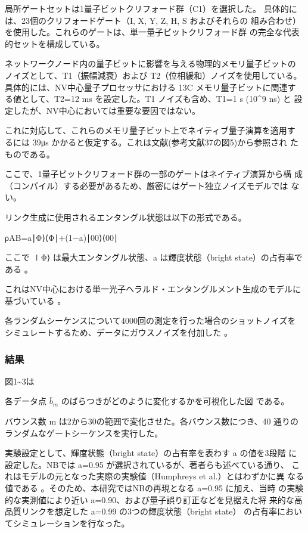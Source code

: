 \documentclass[conference]{IEEEtran}
\begin{document}
局所ゲートセットは1量子ビットクリフォード群（C1​）を選択した。
具体的には、23個のクリフォードゲート（I, X, Y, Z, H, S およびそれらの
組み合わせ）を使用した。これらのゲートは、単一量子ビットクリフォード群
の完全な代表的セットを構成している。


ネットワークノード内の量子ビットに影響を与える物理的メモリ量子ビットの
ノイズとして、T1​（振幅減衰）および T2​（位相緩和）ノイズを使用している。
具体的には、NV中心量子プロセッサにおける 13C メモリ量子ビットに関連す
る値として、T2​=12 ms を設定した。T1​ ノイズも含め、T1​=1 s (10\^{}9 ns) と
設定したが、NV中心においては重要な要因ではない。

これに対応して、これらのメモリ量子ビット上でネイティブ量子演算を適用す
るには 39μs かかると仮定する。これは文献(参考文献37の図5)から参照され
たものである。

ここで、1量子ビットクリフォード群の一部のゲートはネイティブ演算から構
成（コンパイル）する必要があるため、厳密にはゲート独立ノイズモデルでは
ない。

リンク生成に使用されるエンタングル状態は以下の形式である。

ρAB​=a∣Φ⟩⟨Φ∣+(1−a)∣00⟩⟨00∣

ここで ∣Φ⟩ は最大エンタングル状態、a は輝度状態（bright state）の占有率である 。

これはNV中心における単一光子ヘラルド・エンタングルメント生成のモデルに
基づいている 。

各ランダムシーケンスについて4000回の測定を行った場合のショットノイズを
シミュレートするため、データにガウスノイズを付加した 。




\subsubsection*{結果}
\label{sec:orgb15528b}
図1\textasciitilde{}3は

各データ点 \(\bar{b}_m\) のばらつきがどのように変化するかを可視化した図
である。

バウンス数 m は2から30の範囲で変化させた。各バウンス数につき、40
通りのランダムなゲートシーケンスを実行した。


実験設定として、輝度状態（bright state）の占有率を表わす a の値を3段階
に設定した。NBでは a=0.95 が選択されているが、著者らも述べている通り、
これはモデルの元となった実際の実験値（Humphreys et al.）とはわずかに異
なる値である 。そのため、本研究ではNBの再現となる a=0.95 に加え、当時
の実験的な実測値により近い a=0.90、および量子誤り訂正などを見据えた将
来的な高品質リンクを想定した a=0.99 の3つの輝度状態（bright state）
の占有率においてシミュレーションを行なった。
\end{document}
